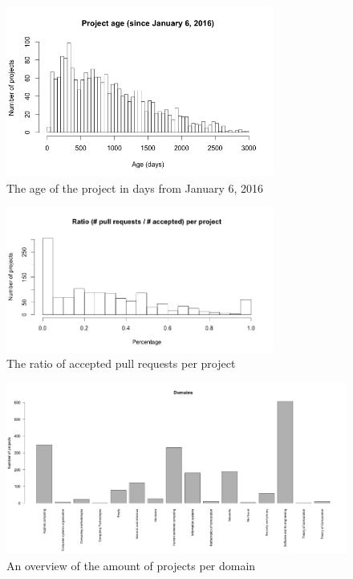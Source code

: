 	    \begin{figure}[h!]
	        \includegraphics[width=250pt]{figures/project-age}
	        \caption{The age of the project in days from January 6, 2016}
	        \label{fig:age-plot}
	    \end{figure}

	    \begin{figure}[h]
	        \includegraphics[width=250pt]{figures/ratio-pull-request-per-project}
	        \caption{The ratio of accepted pull requests per project}
	        \label{fig:ratio-pull-requests-plot}
	    \end{figure}

	    \begin{figure}[t!]
	        \includegraphics[width=500pt]{figures/project-domains}
	        \caption{An overview of the amount of projects per domain}
	        \label{fig:project-domain-plot}
	    \end{figure}

